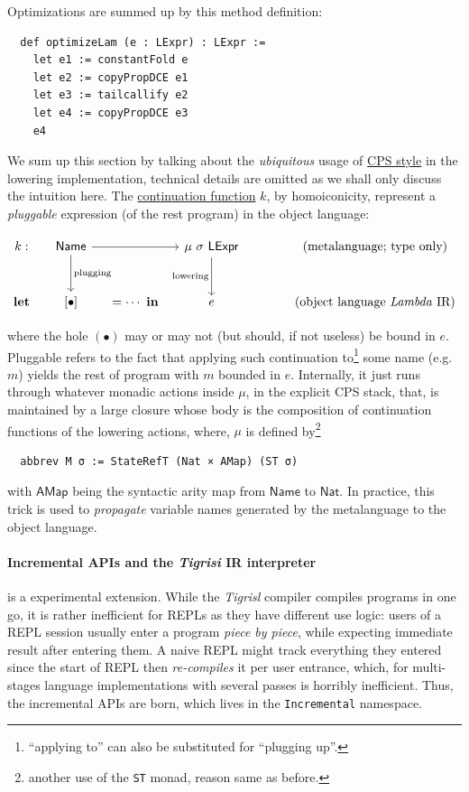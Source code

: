 \documentclass[a4paper, 11pt]{article}
\theoremstyle{remark}\newtheorem*{remark}{Remark}
\theoremstyle{definition}\newtheorem*{definition}{Definition}
\begin{document}
Optimizations are summed up by this method definition: \begin{verbatim}
  def optimizeLam (e : LExpr) : LExpr :=
    let e1 := constantFold e
    let e2 := copyPropDCE e1
    let e3 := tailcallify e2
    let e4 := copyPropDCE e3
    e4
\end{verbatim}

We sum up this section by talking about the \emph{ubiquitous} usage of \underline{CPS style}
in the lowering implementation, technical
details are omitted as we shall only discuss the intuition here.
The \underline{continuation function} $k$, by homoiconicity, represent a \emph{pluggable} expression (of the rest program)
in the object language:

\[
\begin{tikzcd}[column sep=small,row sep=scriptsize]
  {k:} & {\mathsf{Name}} && {\mu\ \sigma\ \mathsf{LExpr}} &&& {\text{(metalanguage; type only)}} \\
  \\
  {\mathbf{let}} & {[\bullet]} & {=\cdots\ \mathbf{in}} & e &&& {\text{(object language \Lambdair)}}
  \arrow[from=1-2, to=1-4]
  \arrow["{\text{plugging}}", from=1-2, to=3-2]
  \arrow["{\text{lowering}}"', from=1-4, to=3-4]
\end{tikzcd}\]

where the hole $(\bullet)$ may or may not (but should, if not useless) be bound in $e$. Pluggable refers to the
fact that applying
such continuation to\footnote{
``applying to'' can also be substituted for ``plugging up''.
}
some name (e.g. $m$) yields the rest of program with $m$ bounded in $e$. Internally, it just runs through whatever monadic
actions inside $\mu$, in the explicit CPS stack, that, is maintained by a large closure whose body is the composition of
continuation functions of the lowering actions, where, $\mu$ is defined by\footnote{
another use of the \texttt{ST} monad, reason same as before.
}
\begin{verbatim}
  abbrev M σ := StateRefT (Nat × AMap) (ST σ)
\end{verbatim}
with $\mathsf{AMap}$ being the syntactic arity map from $\mathsf{Name}$ to $\mathsf{Nat}$.
In practice, this trick is used to
\emph{propagate} variable names generated by the metalanguage to the object language.

\paragraph{Incremental APIs and the \emph{Tigrisi} IR interpreter} is a experimental
extension. While the \emph{Tigrisl} compiler compiles programs in one go, it is rather
inefficient for REPLs as they have different use logic: users of a REPL session
usually enter a program \emph{piece by piece}, while expecting immediate result after entering
them. A naive REPL might track everything they entered since the start of REPL then \emph{re-compiles}
it per user entrance, which, for multi-stages language implementations with several passes is horribly
inefficient. Thus, the incremental APIs are born, which lives in the \texttt{Incremental} namespace.
\end{document}
